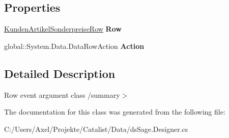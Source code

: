 \subsection*{Properties}
\begin{DoxyCompactItemize}
\item 
\hyperlink{class_products_1_1_data_1_1ds_sage_1_1_kunden_artikel_sonderpreise_row}{Kunden\+Artikel\+Sonderpreise\+Row} {\bfseries Row}\hypertarget{class_products_1_1_data_1_1ds_sage_1_1_kunden_artikel_sonderpreise_row_change_event_a4b3f9b69218341ec185b77701ee063d3}{}\label{class_products_1_1_data_1_1ds_sage_1_1_kunden_artikel_sonderpreise_row_change_event_a4b3f9b69218341ec185b77701ee063d3}

\item 
global\+::\+System.\+Data.\+Data\+Row\+Action {\bfseries Action}\hypertarget{class_products_1_1_data_1_1ds_sage_1_1_kunden_artikel_sonderpreise_row_change_event_a34be242850f1d3375d2b559d0909dc08}{}\label{class_products_1_1_data_1_1ds_sage_1_1_kunden_artikel_sonderpreise_row_change_event_a34be242850f1d3375d2b559d0909dc08}

\end{DoxyCompactItemize}


\subsection{Detailed Description}
Row event argument class /summary$>$ 

The documentation for this class was generated from the following file\+:\begin{DoxyCompactItemize}
\item 
C\+:/\+Users/\+Axel/\+Projekte/\+Catalist/\+Data/ds\+Sage.\+Designer.\+cs\end{DoxyCompactItemize}
